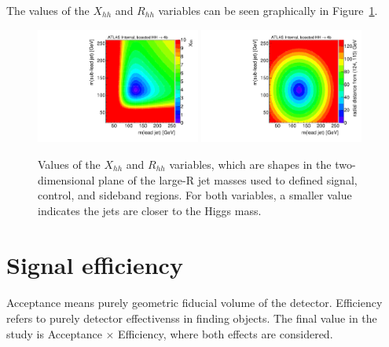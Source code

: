 The values of the $X_{hh}$ and $R_{hh}$ variables can be seen graphically in Figure~\ref{fig:boosted-regiondef-cartoons}.
\begin{figure}[htbp!]
\begin{center}
  \includegraphics[width=0.48\textwidth,angle=-90]{figures/boosted/Other/cartoon-xhh.pdf}
  \includegraphics[width=0.48\textwidth,angle=-90]{figures/boosted/Other/cartoon-rhh.pdf}
  \caption{Values of the $X_{hh}$ and $R_{hh}$ variables, which are shapes in the two-dimensional plane of the large-R jet masses used to defined signal, control, and sideband regions. For both variables, a smaller value indicates the jets are closer to the Higgs mass. }
  \label{fig:boosted-regiondef-cartoons}
\end{center}
\end{figure}


\section{Signal efficiency}
\paragraph{}
Acceptance means purely geometric fiducial volume of the detector. Efficiency refers to purely detector effectivenss in finding objects. The final value in the study is Acceptance $\times$ Efficiency, where both effects are considered.

